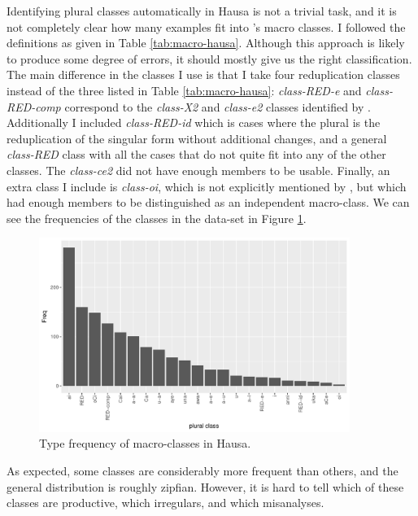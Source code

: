 Identifying plural classes automatically in Hausa is not a trivial task, and it is not completely clear how many examples fit into \textcite{Newman.2000}'s macro classes. I followed the definitions as given in Table \ref{tab:macro-hausa}. Although this approach is likely to produce some degree of errors, it should mostly give us the right classification. The main difference in the classes I use is that I take four reduplication classes instead of the three listed in Table \ref{tab:macro-hausa}: \textit{class-RED-e} and \textit{class-RED-comp} correspond to the \textit{class-X2} and \textit{class-e2} classes identified by \textcite{Newman.2000}. Additionally I included \textit{class-RED-id} which is cases where the plural is the reduplication of the singular form without additional changes, and a general \textit{class-RED} class with all the cases that do not quite fit into any of the other classes. The \textit{class-ce2} did not have enough members to be usable. Finally, an extra class I include is \textit{class-oi}, which is not explicitly mentioned by \textcite{Newman.2000}, but which had enough members to be distinguished as an independent macro-class. We can see the frequencies of the classes in the data-set in Figure \ref{fig:class-hausa-freqs}.

\begin{figure}[!htpb]
  \includegraphics[width=0.9\textwidth]{./figures/hausa/class-freqs.pdf}
  \caption{Type frequency of macro-classes in Hausa.}\label{fig:class-hausa-freqs}
\end{figure}

As expected, some classes are considerably more frequent than others, and the general distribution is roughly zipfian. However, it is hard to tell which of these classes are productive, which irregulars, and which misanalyses.

